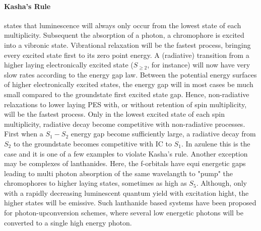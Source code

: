 				\paragraph{Kasha's Rule} states that luminescence will always only occur from the lowest state of each multiplicity. Subsequent the absorption of a photon, a chromophore is excited into a vibronic state. Vibrational relaxation will be the fastest process, bringing every excited state first to its zero point energy. A (radiative) transition from a higher laying electronically excited state ($S_{\geq 2}$, for instance) will now have very slow rates according to the energy gap law. Between the potential energy surfaces of higher electronically excited states, the energy gap will in most cases be much small compared to the groundstate first excited state gap. Hence, non-radiative relaxations to lower laying PES with, or without retention of spin multiplicity, will be the fastest process. Only in the lowest excited state of each spin multiplicity, radiative decay become competitive with non-radiative processes. First when a $S_1 - S_2$ energy gap become sufficiently large, a radiative decay from $S_2$ to the groundstate becomes competitive with IC to $S_1$. In azulene this is the case and it is one of a few examples to violate Kasha's rule.
				Another exception may be complexes of lanthanides. Here, the f-orbitals have equi energetic gaps leading to multi photon absorption of the same wavelangth to "pump" the chromophores to higher laying states, sometimes as high as $S_5$. Although, only with a rapidly decreasing luminescent quantum yield with excitation hight, the higher states will be emissive. Such lanthanide based systems have been proposed for photon-upconversion schemes, where several low energetic photons will be converted to a single high energy photon. %

